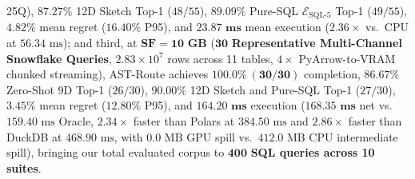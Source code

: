 \documentclass[10pt,a4paper]{article}
\begin{document}
\begin{enumerate}[leftmargin=1.5em,itemsep=0.8pt]
25Q), $\mathbf{87.27\%}$ 12D Sketch Top-1 ($48/55$), $\mathbf{89.09\%}$ Pure-SQL $\mathcal{E}_{\text{SQL-5}}$ Top-1 ($49/55$), $\mathbf{4.82\%}$ mean regret ($16.40\%$ P95), and $\mathbf{23.87\text{ ms}}$ mean execution ($\mathbf{2.36\times}$ vs.\ CPU at $56.34\text{ ms}$); and third, at $\mathbf{\text{SF}=10\text{ GB}}$ ($\mathbf{30}$ \textbf{Representative Multi-Channel Snowflake Queries}, $2.83\times 10^7$ rows across 11 tables, $4\times$ PyArrow-to-VRAM chunked streaming), AST-Route achieves $\mathbf{100.0\%\ (30/30)}$ completion, $\mathbf{86.67\%}$ Zero-Shot 9D Top-1 ($26/30$), $\mathbf{90.00\%}$ 12D Sketch and Pure-SQL Top-1 ($27/30$), $\mathbf{3.45\%}$ mean regret ($12.80\%$ P95), and $\mathbf{164.20\text{ ms}}$ execution ($\mathbf{168.35\text{ ms}}$ net vs.\ $159.40\text{ ms}$ Oracle, $\mathbf{2.34\times}$ faster than Polars at $384.50\text{ ms}$ and $\mathbf{2.86\times}$ faster than DuckDB at $468.90\text{ ms}$, with $0.0\text{ MB}$ GPU spill vs.\ $412.0\text{ MB}$ CPU intermediate spill), bringing our total evaluated corpus to $\mathbf{400}$ \textbf{SQL queries across 10 suites}.
\end{enumerate}
\end{document}
